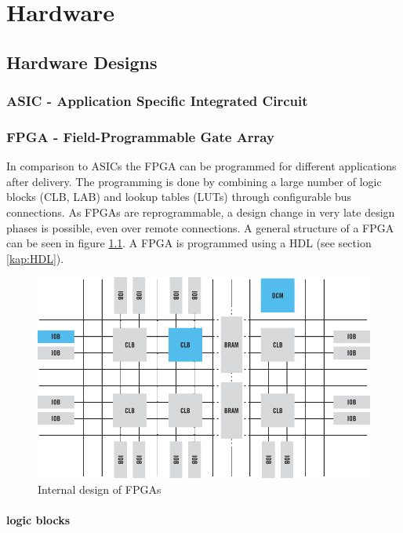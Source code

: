 \chapter{Hardware}
\section{Hardware Designs}
\subsection{ASIC - Application Specific Integrated Circuit}

\subsection{FPGA - Field-Programmable Gate Array}
In comparison to ASICs the FPGA can be programmed for different applications after delivery. The programming is done by combining a large number of logic blocks (CLB, LAB) and lookup tables (LUTs) through configurable bus connections. As FPGAs are reprogrammable, a design change in very late design phases is possible, even over remote connections. A general structure of a FPGA can be seen in figure \ref{fig:fpgablocksgeneral}. A FPGA is programmed using a HDL (see section \ref{kap:HDL}).
\begin{figure}[htbp]
\begin{center}
\includegraphics[width=14cm,keepaspectratio=true]{bilder/png/fpgablocksgeneral}
\caption{Internal design of FPGAs}
\label{fig:fpgablocksgeneral}
\end{center}
\end{figure}
\subsubsection{logic blocks}

